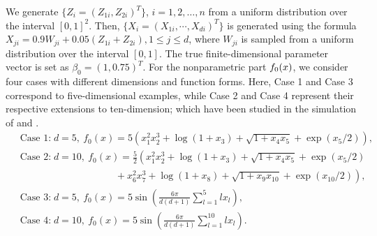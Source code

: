 
We generate \(\{Z_i=(Z_{1i},Z_{2i})^T\}\), \(i=1, 2, \dots, n\) from a uniform distribution over the interval $[0,1]^2$. Then, \(\{X_i=(X_{1i},\cdots,X_{di})^T\}\) is generated using the formula $X_{ji}=0.9W_{ji}+0.05(Z_{1i}+Z_{2i}),1\le j\le d$, where $W_{ji}$ is sampled from a uniform distribution over the interval $[0,1]$. 
The true finite-dimensional parameter vector is set as \(\beta_0 = (1, 0.75)^T\).
For the nonparametric part \(f_{0}(x)\), we consider four cases with different dimensions and function forms. Here, Case 1 and Case 3 correspond to five-dimensional examples, while Case 2 and Case 4 represent their respective extensions to ten-dimension; which have been studied in the simulation of \citet{deepcox} and \citet{yan2023nonparametricregressionrepeatedmeasurements}.
\begin{align*}
    &\operatorname{Case\ 1:} d = 5,\ f_0(x) = 5\left(x_1^2x_2^3+\log(1+x_3)+\sqrt{1+x_4x_5} +\exp(x_5/2)\right),\\
    &\operatorname{Case\ 2:} d = 10,\ f_0(x) =\frac{5}{2}\left(x_1^2x_2^3+\log(1+x_3)+\sqrt{1+x_4x_5} +\exp(x_5/2)\right. \\&\hspace{10em}+\left.x_6^2x_7^3+\log(1+x_8)+\sqrt{1+x_9x_{10}} +\exp(x_{10}/2)\right),\\
      &\operatorname{Case\ 3:} d = 5,\ f_0(x) = 5\sin\left(\frac{6\pi}{d(d+1)}\sum_{l=1}^5 lx_l\right), \\
    &\operatorname{Case\ 4:} d = 10,\ f_0(x) = 5\sin\left(\frac{6\pi}{d(d+1)}\sum_{l=1}^{10} lx_l\right).
\end{align*}

